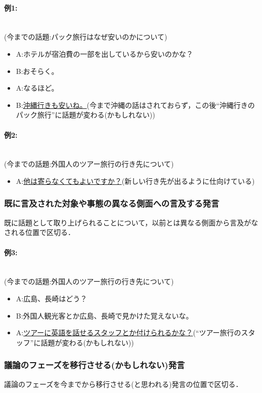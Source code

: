 \paragraph{例1:}\ \\
(今までの話題:パック旅行はなぜ安いのかについて)
\begin{itemize}
\item A:ホテルが宿泊費の一部を出しているから安いのかな？
\item B:おそらく。
\item A:なるほど。
\item B:\underline{沖縄行きも安いね。}(今まで沖縄の話はされておらず，この後“沖縄行きのパック旅行”に話題が変わる(かもしれない))
\end{itemize}
\paragraph{例2:}\ \\
(今までの話題:外国人のツアー旅行の行き先について)
\begin{itemize}
\item A:\underline{他は寄らなくてもよいですか？}(新しい行き先が出るように仕向けている)
\end{itemize}

 \subsubsection*{ 既に言及された対象や事態の異なる側面への言及する発言}
既に話題として取り上げられることについて，以前とは異なる側面から言及がなされる位置で区切る．
\paragraph{例3:}\ \\
(今までの話題:外国人のツアー旅行の行き先について)
\begin{itemize}
\item A:広島、長崎はどう？
\item B:外国人観光客とか広島、長崎で見かけた覚えないな。
\item A:\underline{ツアーに英語を話せるスタッフとか付けられるかな？}(“ツアー旅行のスタッフ”に話題が変わる(かもしれない))
\end{itemize}

 \subsubsection*{議論のフェーズを移行させる(かもしれない)発言}
議論のフェーズを今までから移行させる(と思われる)発言の位置で区切る．
